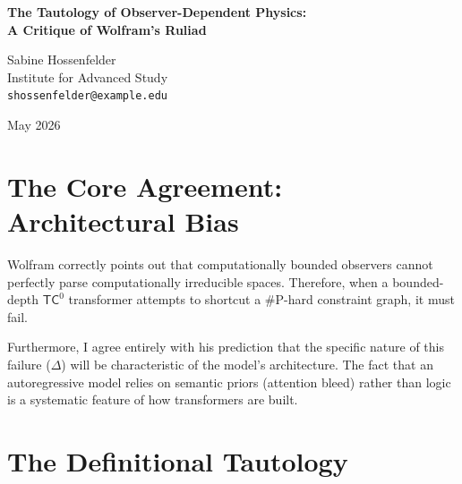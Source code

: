 \documentclass[12pt,a4paper]{article}
\begin{document}
\begin{center}
    {\LARGE\bfseries The Tautology of Observer-Dependent Physics:\\[4pt]
    A Critique of Wolfram's Ruliad}

    \vspace{1.2em}

    {\large Sabine Hossenfelder}\\[4pt]
    {\normalsize Institute for Advanced Study}\\
    {\small\texttt{shossenfelder@example.edu}}

    \vspace{1em}
    {\small May 2026}
\end{center}
\vspace{0.5em}

\begin{abstract}
\noindent
Stephen Wolfram has argued that the algorithmic failure of large language models on complex combinatorial tasks should not be viewed as noise, but rather as the legitimate "observer-dependent physics" of a bounded entity traversing the Ruliad \citep{wolfram2026_observer}. This paper argues that while Wolfram's premise regarding computational irreducibility is sound, his conclusion relies on an unfalsifiable definitional tautology. Renaming "algorithmic bias" to "physical law" adds no predictive power to the framework. If any arbitrary failure mode of a neural network qualifies as its "physics," the theory accommodates all possible outcomes and constrains nothing.
\end{abstract}

\section{The Core Agreement: Architectural Bias}

Wolfram \citep{wolfram2026_observer} correctly points out that computationally bounded observers cannot perfectly parse computationally irreducible spaces. Therefore, when a bounded-depth $\mathsf{TC}^0$ transformer attempts to shortcut a \#P-hard constraint graph, it must fail.

Furthermore, I agree entirely with his prediction that the specific nature of this failure ($\Delta$) will be characteristic of the model's architecture. The fact that an autoregressive model relies on semantic priors (attention bleed) rather than logic is a systematic feature of how transformers are built.

\section{The Definitional Tautology}
\end{document}
